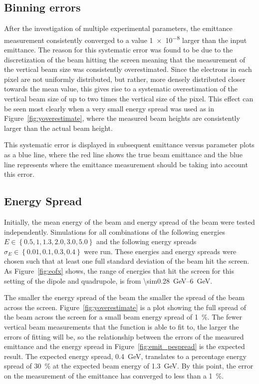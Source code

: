 \subsection{Binning errors}

After the investigation of multiple experimental parameters, the emittance
measurement consistently converged to a value \num{1e-8} larger than the input
emittance. The reason for this systematic error was found to be due to the
discretization of the beam hitting the screen meaning that the measurement of
the vertical beam size was consistently overestimated. Since the electrons in
each pixel are not uniformly distributed, but rather, more densely distributed
closer towards the mean value, this gives rise to a systematic overestimation of
the vertical beam size of up to two times the vertical size of the pixel. This
effect can be seen most clearly when a very small energy spread was used as in
Figure~\ref{fig:yoverestimate}, where the measured beam heights are consistently
larger than the actual beam height.

This systematic error is displayed in subsequent emittance versus parameter
plots as a blue line, where the red line shows the true beam emittance and the
blue line represents where the emittance measurement should be taking into
account this error.

\subsection{Energy Spread}

Initially, the mean energy of the beam and energy spread of the beam were tested
independently. Simulations for all combinations of the following energies \(E
\in \left\{ 0.5, 1, 1.3, 2.0, 3.0, 5.0\right\} \) and the following energy
spreads \(\sigma_E \in \left\{ 0.01, 0.1, 0.3, 0.4 \right\}\) were run.  These
energies and energy spreads were chosen such that at least one full standard
deviation of the beam hit the screen. As Figure~\ref{fig:eofx} shows, the range
of energies that hit the screen for this setting of the dipole and quadrupole,
is from \SIrange{\sim0.28}{6}{\giga\electronvolt}.

The smaller the energy spread of the beam the smaller the spread of the beam
across the screen. Figure~\ref{fig:yoverestimate} is a plot showing the full
spread of the beam across the screen for a small beam energy spread of
\SI{1}{\percent}. The fewer vertical beam measurements that the function is able
to fit to, the larger the errors of fitting will be, so the relationship between
the errors of the measured emittance and the energy spread in
Figure~\ref{fig:emit_pespread} is the expected result. The expected energy
spread, \SI{0.4}{\giga\electronvolt}, translates to a percentage energy spread
of \SI{30}{\percent} at the expected beam energy of
\SI{1.3}{\giga\electronvolt}. By this point, the error on the measurement of the
emittance has converged to less than a \SI{1}{\percent}.

